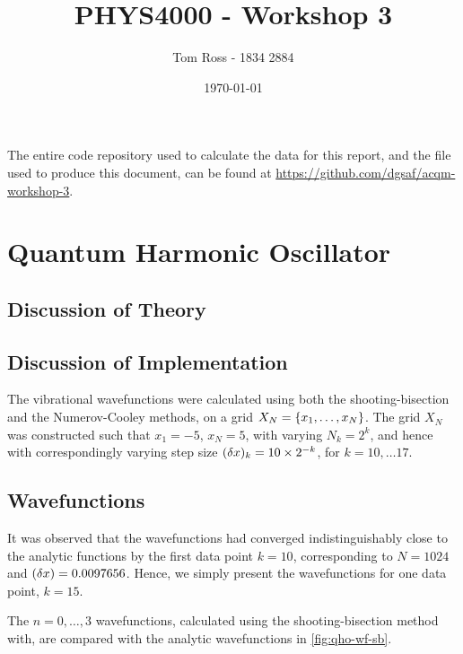 \documentclass{article}
\title{PHYS4000 - Workshop 3}
\author{Tom Ross - 1834 2884}
\date{\today}
\begin{document}
\tableofcontents

\listoffigures

\listoftables

\clearpage

The entire code repository used to calculate the data for this report, and the
 file used to produce this  document, can be found at
\url{https://github.com/dgsaf/acqm-workshop-3}.


\section{Quantum Harmonic Oscillator}
\label{sec:qho}

\subsection*{Discussion of Theory}
\label{sec:qho-theory}

\subsection*{Discussion of Implementation}
\label{sec:qho-implementation}

The vibrational wavefunctions were calculated using both the shooting-bisection
and the Numerov-Cooley methods, on a grid
$X_{N} = \lbrace x_{1}, \dotsc, x_{N}\rbrace$.
The grid $X_{N}$ was constructed such that $x_{1} = -5$, $x_{N} = 5$, with
varying $N_{k} = 2^{k}$, and hence with correspondingly varying step size
$(\delta x)_{k} = 10 \times 2^{-k}$, for $k = 10, \dotsc 17$.

\subsection*{Wavefunctions}
\label{sec:qho-wavefunctions}

It was observed that the wavefunctions had converged indistinguishably close to
the analytic functions by the first data point $k = 10$, corresponding to
$N = 1024$ and $(\delta x) = 0.0097656$.
Hence, we simply present the wavefunctions for one data point, $k = 15$.

The $n = 0, \dotsc, 3$ wavefunctions, calculated using the shooting-bisection
method with, are compared with the analytic wavefunctions in
\autoref{fig:qho-wf-sb}.
\end{document}
